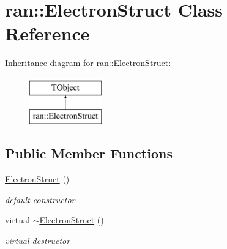 \hypertarget{classran_1_1ElectronStruct}{\section{ran\-:\-:Electron\-Struct Class Reference}
\label{classran_1_1ElectronStruct}
}
Inheritance diagram for ran\-:\-:Electron\-Struct\-:\begin{figure}[H]
\begin{center}
\leavevmode
\includegraphics[height=2.000000cm]{classran_1_1ElectronStruct}
\end{center}
\end{figure}
\subsection*{Public Member Functions}
\begin{DoxyCompactItemize}
\item 
\hypertarget{classran_1_1ElectronStruct_afb7806d66cffdb8eeab1b0a7f64fa7f1}{\hyperlink{classran_1_1ElectronStruct_afb7806d66cffdb8eeab1b0a7f64fa7f1}{Electron\-Struct} ()}\label{classran_1_1ElectronStruct_afb7806d66cffdb8eeab1b0a7f64fa7f1}

\begin{DoxyCompactList}\small\item\em default constructor \end{DoxyCompactList}\item 
\hypertarget{classran_1_1ElectronStruct_a53b22b327ab22c53754017765e92fc1a}{virtual \hyperlink{classran_1_1ElectronStruct_a53b22b327ab22c53754017765e92fc1a}{$\sim$\-Electron\-Struct} ()}\label{classran_1_1ElectronStruct_a53b22b327ab22c53754017765e92fc1a}

\begin{DoxyCompactList}\small\item\em virtual destructor \end{DoxyCompactList}\end{DoxyCompactItemize}
